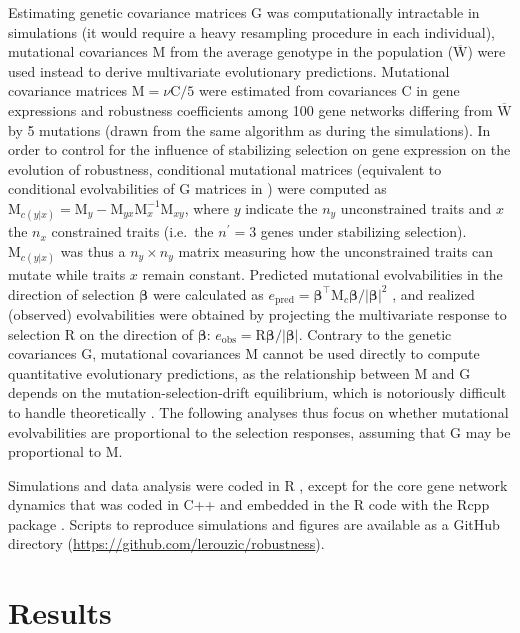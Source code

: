 \documentclass[10pt,a4paper]{article}
\newcommand{\W}{\bm{\mathrm W}}
\newcommand{\M}{\bm{\mathrm M}}
\begin{document}
Estimating genetic covariance matrices $\bm{\mathrm G}$ was computationally intractable in simulations (it would require a heavy resampling procedure in each individual), mutational covariances $\M$ from the average genotype in the population ($\overline{\W}$) were used instead to derive multivariate evolutionary predictions. Mutational covariance matrices $\M = \nu \bm{\mathrm C}/5$ were estimated from covariances $\bm{\mathrm C}$ in gene expressions and robustness coefficients among 100 gene networks differing from $\overline{\W}$ by 5 mutations (drawn from the same algorithm as during the simulations). In order to control for the influence of stabilizing selection on gene expression on the evolution of robustness, conditional mutational matrices (equivalent to conditional evolvabilities of $ \bm{\mathrm G}$ matrices in \cite{HH08}) were computed as $\M_{c(y|x)} =\M_y - \M_{yx} \M_x^{-1} \M_{xy}$, where $y$ indicate the $n_y$ unconstrained traits and $x$ the $n_x$ constrained traits (i.e.\ the $n^\prime = 3$ genes under stabilizing selection). $\M_{c(y|x)}$ was thus a $n_y \times n_y$ matrix measuring how the unconstrained traits can mutate while traits $x$ remain constant. Predicted mutational evolvabilities in the direction of selection $\bm \beta$ were calculated as $e_\mathrm{pred} = \bm\beta^\top \M_c \bm\beta / |\bm\beta|^2$ \citep{HH08}, and realized (observed) evolvabilities were obtained by projecting the multivariate response to selection $\bm{\mathrm R}$ on the direction of $\bm\beta$: $e_\mathrm{obs} = \bm{\mathrm R} \bm\beta / |\bm\beta|$. Contrary to the genetic covariances $\bm{\mathrm G}$, mutational covariances $\M$ cannot be used directly to compute quantitative evolutionary predictions, as the relationship between $\M$ and $\bm{\mathrm G}$ depends on the mutation-selection-drift equilibrium, which is notoriously difficult to handle theoretically \citep{BL94}. The following analyses thus focus on whether mutational evolvabilities are proportional to the selection responses, assuming that $\bm{\mathrm G}$ may be proportional to $\M$.  

Simulations and data analysis were coded in R \citep{R20}, except for the core gene network dynamics that was coded in C++ and embedded in the R code with the Rcpp package \citep{EF11}. Scripts to reproduce simulations and figures are available as a GitHub directory (\url{https://github.com/lerouzic/robustness}). 

\section{Results}
\end{document}
